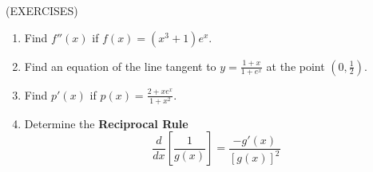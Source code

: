 \documentclass[11pt]{article}
\begin{document}
(EXERCISES)
\begin{enumerate}
\item{Find $f''(x)$ if $f(x) = (x^3+1)e^x$.}

  \vspace{2in}

\item{Find an equation of the line tangent to $y=\frac{1+x}{1+e^x}$ at the point $\left(0,\frac12\right)$.}

  \vspace{2in}

\item{Find $p'(x)$ if $p(x) = \frac{2+xe^x}{1+x^2}$.}

  \vspace{2in}

\item{Determine the {\bf Reciprocal Rule}
\begin{displaymath}
\frac{d}{dx}\left[\frac{1}{g(x)}\right]= \frac{-g'(x)}{[g(x)]^2}
\end{displaymath}
}
\end{enumerate}
\end{document}
